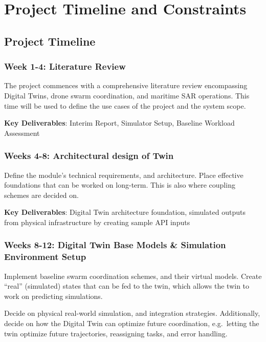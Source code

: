 \section{Project Timeline and Constraints}\label{sec:project-timeline-and-constraints}

\subsection{Project Timeline}\label{subsec:project-timeline}

\subsubsection{Week 1-4: Literature Review}\label{subsubsec:literature-review}
The project commences with a comprehensive literature review encompassing Digital Twins, drone swarm coordination, and maritime SAR operations.
This time will be used to define the use cases of the project and the system scope.

\textbf{Key Deliverables}: Interim Report, Simulator Setup, Baseline Workload Assessment

\subsubsection{Weeks 4-8: Architectural design of Twin}\label{subsubsec:architectural-design-of-twin}
Define the module’s technical requirements, and architecture.
Place effective foundations that can be worked on long-term.
This is also where coupling schemes are decided on.

\textbf{Key Deliverables}: Digital Twin architecture foundation, simulated outputs from physical infrastructure by creating sample API inputs

\subsubsection{Weeks 8-12: Digital Twin Base Models \& Simulation Environment Setup}\label{subsubsec:digital-twin-base-models-&-simulation-environment-setup}
Implement baseline swarm coordination schemes, and their virtual models.
Create ``real'' (simulated) states that can be fed to the twin, which allows the twin to work on predicting simulations.

Decide on physical real-world simulation, and integration strategies.
Additionally, decide on how the Digital Twin can optimize future coordination, e.g.\ letting the twin optimize future trajectories, reassigning tasks, and error handling.

